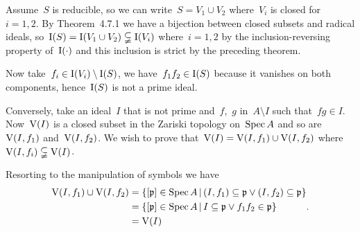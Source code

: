 \begin{exercise}
  Assume~$S$ is reducible, so we can write~$S=V_1\cup V_2$ where~$V_i$ is closed for~$i=1,2$. By Theorem~4.7.1 we have a bijection between closed subsets and radical ideals, so~$\operatorname{I}(S)=\operatorname{I}(V_1\cup V_2)\subsetneqq\operatorname{I}(V_i)$ where~$i=1,2$ by the inclusion-reversing property of~$\operatorname{I}(\cdot)$ and this inclusion is strict by the preceding theorem.

  Now take~$f_i\in\operatorname{I}(V_i)\setminus\operatorname{I}(S)$, we have~$f_1f_2\in\operatorname{I}(S)$ because it vanishes on both components, hence~$\operatorname{I}(S)$ is not a prime ideal.

  Conversely, take an ideal~$I$ that is not prime and~$f$,~$g$ in~$A\setminus I$ such that~$fg\in I$. Now~$\operatorname{V}(I)$ is a closed subset in the Zariski topology on~$\operatorname{Spec} A$ and so are~$\operatorname{V}(I,f_1)$ and~$\operatorname{V}(I,f_2)$. We wish to prove that~$\operatorname{V}(I)=\operatorname{V}(I,f_1)\cup\operatorname{V}(I,f_2)$ where~$\operatorname{V}(I,f_i)\subsetneqq\operatorname{V}(I)$.

  Resorting to the manipulation of symbols we have
  \begin{equation}
    \begin{aligned}
      \operatorname{V}(I,f_1)\cup\operatorname{V}(I,f_2)&=\left\{ [\mathfrak{p}]\in\operatorname{Spec} A\,|\,(I,f_1)\subseteq\mathfrak{p}\vee(I,f_2)\subseteq\mathfrak{p} \right\} \\
      &=\left\{ [\mathfrak{p}]\in\operatorname{Spec} A\,|\,I\subseteq\mathfrak{p}\vee f_1f_2\in\mathfrak{p} \right\} \\
      &=\operatorname{V}(I)
    \end{aligned}.
  \end{equation}
\end{exercise}

